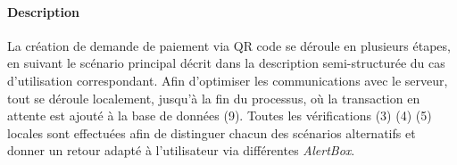 \paragraph{Description} La création de demande de paiement via QR code se déroule en plusieurs étapes, en suivant le scénario principal décrit dans la description semi-structurée du cas d'utilisation correspondant. Afin d'optimiser les communications avec le serveur, tout se déroule localement, jusqu'à la fin du processus, où la transaction en attente est ajouté à la base de données (9). Toutes les vérifications (3) (4) (5) locales sont effectuées afin de distinguer chacun des scénarios alternatifs et donner un retour adapté à l'utilisateur via différentes \emph{AlertBox}.